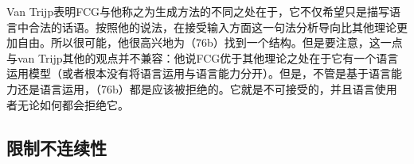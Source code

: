 Van Trijp表明FCG与他称之为生成方法的不同之处在于，它不仅希望只是描写语言中合法的话语。按照他的说法，在接受输入方面这一句法分析导向比其他理论更加自由。所以很可能，他很高兴地为（76b）找到一个结构。但是要注意，这一点与van Trijp其他的观点并不兼容：他说FCG优于其他理论之处在于它有一个语言运用模型（或者根本没有将语言运用与语言能力分开）。但是，不管是基于语言能力还是语言运用，（76b）都是应该被拒绝的。它就是不可接受的，并且语言使用者无论如何都会拒绝它。

\subsection{限制不连续性}
\label{sec-restricting-discont}

